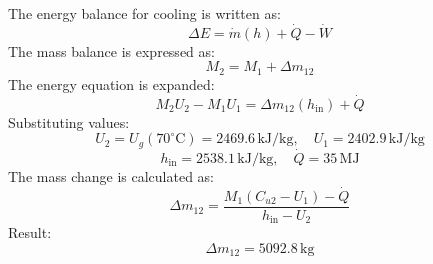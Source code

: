 The energy balance for cooling is written as:  
\[
\Delta E = \dot{m}(h) + \dot{Q} - \dot{W}
\]  
The mass balance is expressed as:  
\[
M_2 = M_1 + \Delta m_{12}
\]  
The energy equation is expanded:  
\[
M_2 U_2 - M_1 U_1 = \Delta m_{12}(h_{\text{in}}) + \dot{Q}
\]  
Substituting values:  
\[
U_2 = U_g(70^\circ\text{C}) = 2469.6 \, \text{kJ/kg}, \quad U_1 = 2402.9 \, \text{kJ/kg}
\]  
\[
h_{\text{in}} = 2538.1 \, \text{kJ/kg}, \quad \dot{Q} = 35 \, \text{MJ}
\]  
The mass change is calculated as:  
\[
\Delta m_{12} = \frac{M_1(C_{u2} - U_1) - \dot{Q}}{h_{\text{in}} - U_2}
\]  
Result:  
\[
\Delta m_{12} = 5092.8 \, \text{kg}
\]